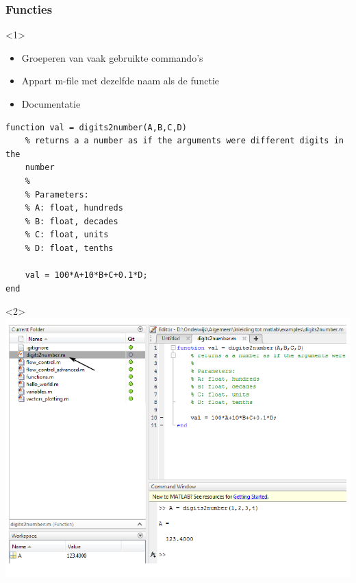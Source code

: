 \documentclass[t]{beamer}
\begin{document}
\begin{frame}[fragile]
	\frametitle{Functies}
\begin{onlyenv}<1>
	\begin{itemize}
		\item Groeperen van vaak gebruikte commando's
		\item Appart m-file met dezelfde naam als de functie
		\item Documentatie
	\end{itemize}

	\begin{lstlisting}
function val = digits2number(A,B,C,D)
	% returns a a number as if the arguments were different digits in the
	number
	%
	% Parameters:
	% A: float, hundreds
	% B: float, decades
	% C: float, units
	% D: float, tenths
	
	val = 100*A+10*B+C+0.1*D;
end
	\end{lstlisting}
\end{onlyenv}
\begin{onlyenv}<2>
	\center
	\includegraphics[height=0.8\textheight]{fig/functie}
\end{onlyenv}
\end{frame}
\end{document}
